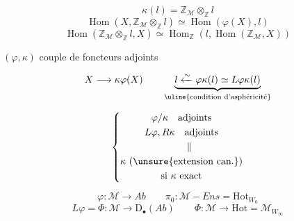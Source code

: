 
\[
\kappa(l)=\mathbb Z_{\mathcal M}\otimes_{\mathbb Z}l
\]
\[
\operatorname{Hom}(X,\mathbb Z_{\mathcal M}\otimes_{\mathbb Z}l)
\simeq\operatorname{Hom}(\varphi(X),l)
\]
\[
\operatorname{Hom}(\mathbb Z_{\mathcal M}\otimes_{\mathbb Z}l,X)
\simeq\operatorname{Hom}_{\mathbb Z}(l,\operatorname{Hom}(\mathbb Z_{\mathcal M},X))
\]

$(\varphi,\kappa)$ couple de foncteurs adjoints

\[
X\longrightarrow\kappa\varphi(X)
\qquad
\underbrace{l\xleftarrow{\sim}\varphi\kappa(l)\simeq L\varphi\kappa(l)}_{\text{\uline{condition d'asphéricité}}}
\]

\[
\left\{\begin{gathered}
\varphi/\kappa\quad\text{adjoints}\\
L\varphi,R\kappa\quad\text{adjoints}\\
\phantom{L\varphi,}\Vert\\
\kappa\ (\text{\unsure{extension can.}})\\
\text{si }\kappa\text{ exact}
\end{gathered}\right.
\]

\[
\varphi:\mathcal M\longrightarrow Ab
\qquad
\pi_0:\mathcal M\mathbin{-}Ens=\mathrm{Hot}_{W_0}
\]
\[
L\varphi=\Phi:\mathcal M\longrightarrow\mathrm D_\bullet(Ab)
\qquad
\Phi:\mathcal M\longrightarrow\mathrm{Hot}=\mathcal M_{W_\infty}
\]

